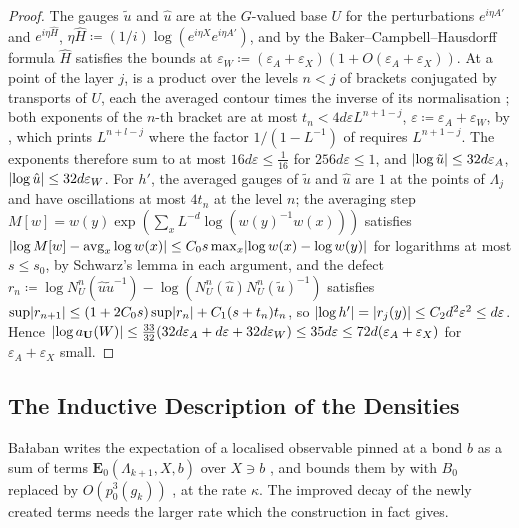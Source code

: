\documentclass[11pt]{preprint}
\DeclarePairedDelimiter{\abs}{\lvert}{\rvert}
\numberwithin{equation}{section}
\theoremstyle{definition}
\theoremstyle{remark}
\theoremstyle{plain}
\begin{document}
\begin{proof}
The gauges $\tilde u$ and $\hat u$ are \cite[(106)]{BalabanAVG} at the $G$-valued base $U$ for the perturbations $e^{i\eta A'}$ and $e^{i\eta\hat H}$, $\eta\hat H \coloneqq (1/i)\log(e^{i\eta X}e^{i\eta A'})$, and by the Baker--Campbell--Hausdorff formula $\hat H$ satisfies the bounds at $\varepsilon_W \coloneqq (\varepsilon_A + \varepsilon_X)(1 + O(\varepsilon_A + \varepsilon_X))$. At a point of the layer $j$, \cite[(106)]{BalabanAVG} is a product over the levels $n < j$ of brackets conjugated by transports of $U$, each the averaged contour times the inverse of its normalisation \cite[(105)]{BalabanAVG}; both exponents of the $n$-th bracket are at most $t_n < 4d\varepsilon L^{n+1-j}$, $\varepsilon \coloneqq \varepsilon_A + \varepsilon_W$, by \cite[(1.71)]{BalabanREG}, which prints $L^{n+l-j}$ where the factor $1/(1 - L^{-1})$ of \cite[(1.72)]{BalabanREG} requires $L^{n+1-j}$. The exponents therefore sum to at most $16d\varepsilon \leq \frac1{16}$ for $256d\varepsilon \leq 1$, and $\abs{\log\tilde u} \leq 32d\varepsilon_A$, $\abs{\log\hat u} \leq 32d\varepsilon_W$. For $h'$, the averaged gauges of $\tilde u$ and $\hat u$ are $1$ at the points of $\Lambda_j$ and have oscillations at most $4t_n$ at the level $n$; the averaging step $M[w] = w(y)\exp(\sum_xL^{-d}\log(w(y)^{-1}w(x)))$ satisfies $\abs{\log M[w] - \mathrm{avg}_x\log w(x)} \leq C_0s\max_x\abs{\log w(x) - \log w(y)}$ for logarithms at most $s \leq s_0$, by Schwarz's lemma in each argument, and the defect $r_n \coloneqq \log N^n_U(\hat u\tilde u^{-1}) - \log(N^n_U(\hat u)N^n_U(\tilde u)^{-1})$ satisfies $\sup\abs{r_{n+1}} \leq (1 + 2C_0s)\sup\abs{r_n} + C_1(s + t_n)t_n$, so $\abs{\log h'} = \abs{r_j(y)} \leq C_2d^2\varepsilon^2 \leq d\varepsilon$. Hence $\abs{\log a_{\mathbf U}(W)} \leq \frac{33}{32}(32d\varepsilon_A + d\varepsilon + 32d\varepsilon_W) \leq 35d\varepsilon \leq 72d(\varepsilon_A + \varepsilon_X)$ for $\varepsilon_A + \varepsilon_X$ small.
\end{proof}

\subsection{The Inductive Description of the Densities}

Ba{\l}aban writes the expectation of a localised observable pinned at a bond $b$ as a sum of terms $\mathbf E_0(\Lambda_{k+1}, X, b)$ over $X \ni b$ \cite[(3.44)--(3.47), p.~277, l.~31--p.~278, l.~31]{BalabanCRE}, and bounds them by \cite[(2.42)]{BalabanCRE} with $B_0$ replaced by $O(p_0^3(g_k))$ \cite[p.~278, ll.~32--33]{BalabanCRE}, at the rate $\kappa$. The improved decay of the newly created terms \cite[p.~262, ll.~24--29]{BalabanCRE} needs the larger rate which the construction in fact gives.
\end{document}
